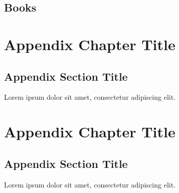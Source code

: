 \documentclass[
	11pt, %
	fleqn, %
	a4paper, %
]{LegrandOrangeBook}
\begin{document}
\section*{Books}

\printbibliography[heading=bibempty, type=book] %


\cleardoublepage %
{} %
\printindex %


\chapterspaceabove{6.75cm} %
\chapterspacebelow{7.25cm} %

\begin{appendices}

\renewcommand{\chaptername}{Appendix} %


\chapter{Appendix Chapter Title}

\section{Appendix Section Title}

Lorem ipsum dolor sit amet, consectetur adipiscing elit.


\chapter{Appendix Chapter Title}

\section{Appendix Section Title}

Lorem ipsum dolor sit amet, consectetur adipiscing elit.


\end{appendices}

\end{document}
